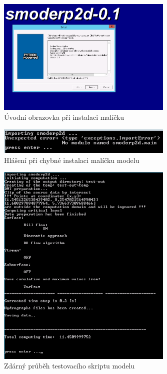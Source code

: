   \begin{figure}[t!]
    \centering
    \includegraphics[width=0.75\textwidth]{./img/instalace.png}
    \caption{Úvodní obrazovka při instalaci malíčku \smod}
    \label{fig:pruvodce}
  \end{figure}
% 
  \begin{figure}[b!]
    \centering
    \includegraphics[width=0.75\textwidth]{./img/importerror.png}
    \caption{Hlášení při chybné instalaci malíčku modelu \smod}
    \label{fig:importerror}
  \end{figure}
% 
  \begin{figure}[t!]
    \centering
    \includegraphics[width=0.75\textwidth]{./img/testok.png}
    \caption{Zdárný průběh testovacího skriptu modelu}
    \label{fig:testok}
  \end{figure}
  
